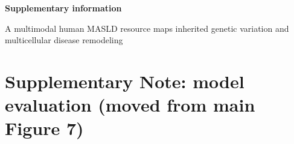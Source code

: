\documentclass[10pt,letterpaper]{article}
\begin{document}
\begin{center}
{\Large\bfseries Supplementary information\par}
\medskip
A multimodal human MASLD resource maps inherited genetic variation and multicellular disease remodeling
\end{center}

\section{Supplementary Note: model evaluation (moved from main Figure 7)}



\end{document}
